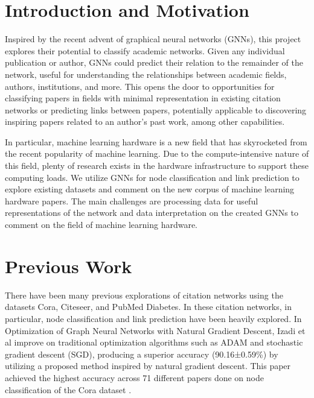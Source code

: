 \documentclass[conference]{IEEEtran}
\begin{document}

\section{Introduction and Motivation}
Inspired by the recent advent of graphical neural networks (GNNs), this project explores their potential to classify academic networks. 
Given any individual publication or author, GNNs could predict their relation to the remainder of the network, 
useful for understanding the relationships between academic fields, authors, institutions, and more. This opens the door to 
opportunities for classifying papers in fields with minimal representation in existing citation networks or predicting links 
between papers, potentially applicable to discovering inspiring papers related to an author's past work, 
among other capabilities. \par

In particular, machine learning hardware is a new field that has skyrocketed from the recent popularity of machine learning. 
Due to the compute-intensive nature of this field, plenty of research exists in the hardware infrastructure to support these 
computing loads. We utilize GNNs for node classification and link prediction to explore existing datasets and comment on the 
new corpus of machine learning hardware papers. The main challenges are processing data for useful representations of the network 
and data interpretation on the created GNNs to comment on the field of machine learning hardware. \par

\section{Previous Work}
There have been many previous explorations of citation networks using the datasets Cora, Citeseer, and PubMed Diabetes. 
In these citation networks, in particular, node classification and link prediction have been heavily explored. 
In Optimization of Graph Neural Networks with Natural Gradient Descent, Izadi et al improve on traditional optimization 
algorithms such as ADAM and stochastic gradient descent (SGD), producing a superior accuracy (90.16±0.59\%) 
by utilizing a proposed method inspired by natural gradient descent. This paper achieved the highest accuracy across 
71 different papers done on node classification of the Cora dataset \cite{CoraAccuracy}.  \par
\end{document}
